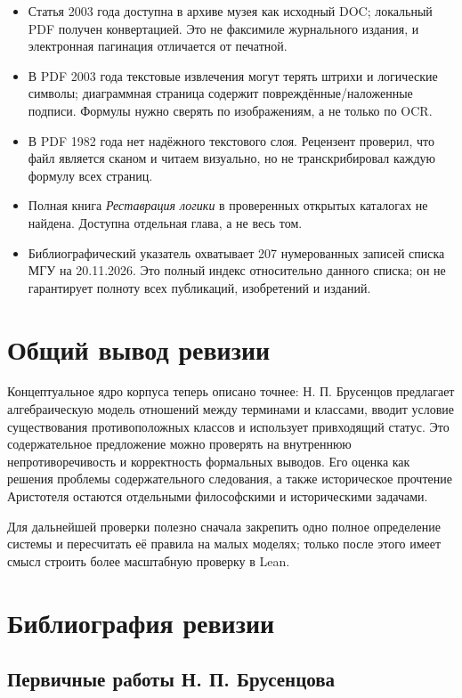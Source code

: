 \documentclass[12pt,a4paper]{article}
\begin{document}
\begin{itemize}
\item Статья 2003 года доступна в архиве музея как исходный DOC; локальный PDF получен конвертацией. Это не факсимиле журнального издания, и электронная пагинация отличается от печатной.
\item В PDF 2003 года текстовые извлечения могут терять штрихи и логические символы; диаграммная страница содержит повреждённые/наложенные подписи. Формулы нужно сверять по изображениям, а не только по OCR.
\item В PDF 1982 года нет надёжного текстового слоя. Рецензент проверил, что файл является сканом и читаем визуально, но не транскрибировал каждую формулу всех страниц.
\item Полная книга \emph{Реставрация логики} в проверенных открытых каталогах не найдена. Доступна отдельная глава, а не весь том.
\item Библиографический указатель охватывает 207 нумерованных записей списка МГУ на 20.11.2026. Это полный индекс относительно данного списка; он не гарантирует полноту всех публикаций, изобретений и изданий.
\end{itemize}
\section{Общий вывод ревизии}

Концептуальное ядро корпуса теперь описано точнее: Н. П. Брусенцов предлагает алгебраическую модель отношений между терминами и классами, вводит условие существования противоположных классов и использует привходящий статус. Это содержательное предложение можно проверять на внутреннюю непротиворечивость и корректность формальных выводов. Его оценка как решения проблемы содержательного следования, а также историческое прочтение Аристотеля остаются отдельными философскими и историческими задачами.

Для дальнейшей проверки полезно сначала закрепить одно полное определение системы и пересчитать её правила на малых моделях; только после этого имеет смысл строить более масштабную проверку в Lean.

\section{Библиография ревизии}

\subsection{Первичные работы Н. П. Брусенцова}
\end{document}
